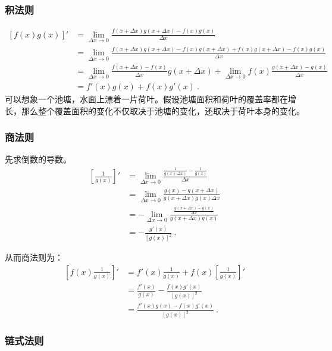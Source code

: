 \subsubsection{积法则}
\begin{equation}
\begin{split}
\left[f(x) g(x)\right]'&=\lim_{\Delta x\to 0}\frac{f(x+\Delta x) g(x+\Delta x)-f(x) g(x)}{\Delta x}\\
&=\lim_{\Delta x\to 0}\frac{f(x+\Delta x) g(x+\Delta x)-f(x) g(x+\Delta x)+f(x) g(x+\Delta x)-f(x) g(x)}{\Delta x}\\
&=\lim_{\Delta x\to 0}\frac{f(x+\Delta x)-f(x)}{\Delta x} g(x+\Delta x)+\lim_{\Delta x\to 0}f(x)\frac{g(x+\Delta x)-g(x)}{\Delta x}\\
&=f'(x)g(x)+f(x) g'(x)~.
\end{split}
\end{equation}
可以想象一个池塘，水面上漂着一片荷叶。假设池塘面积和荷叶的覆盖率都在增长，那么整个覆盖面积的变化不仅取决于池塘的变化，还取决于荷叶本身的变化。

\subsubsection{商法则}
先求倒数的导数。
\begin{equation}
\begin{split}
\left[\frac{1}{g(x)}\right]'&=\lim_{\Delta x\to 0}\frac{\displaystyle\frac{1}{g(x+\Delta x)}-\frac{1}{g(x)}}{\Delta x}\\
&=\lim_{\Delta x\to 0}\frac{g(x)-g(x+\Delta x)}{g(x+\Delta x)g(x)\Delta x}\\
&=-\lim_{\Delta x\to 0}\frac{\frac{g(x+\Delta x)-g(x)}{\Delta x}}{g(x+\Delta x)g(x)}\\
&=-\frac{g'(x)}{[g(x)]^2}~.
\end{split}
\end{equation}

从而商法则为：
\begin{equation}
\begin{split}
\left[f(x) \frac{1}{g(x)}\right]'&=f'(x)\frac{1}{g(x)}+f(x) [\frac{1}{g(x)}]'\\
&=\frac{f'(x)}{g(x)}-\frac{f(x)g'(x)}{[g(x)]^2}\\
&=\frac{f'(x)g(x)-f(x)g'(x)}{[g(x)]^2}~.
\end{split}
\end{equation}

\subsubsection{链式法则}

